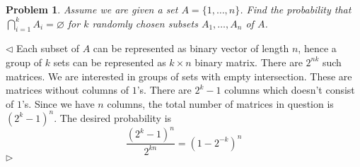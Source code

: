 \documentclass[12pt]{article}
\newtheorem{problem}{Problem}[subsection]
\newenvironment{solution}{\par $\triangleleft$}{$\triangleright$}
\begin{document}
\begin{problem} Assume we are given a set $A=\{1,\ldots,n\}$. Find the
probability that $\bigcap_{i=1}^k A_i=\varnothing$ for $k$ randomly chosen
subsets $A_1,\ldots,A_n$ of $A$.
\end{problem}
\begin{solution} Each subset of $A$ can be represented as binary vector of
    length $n$, hence a group of $k$ sets can be represented as $k\times n$
    binary matrix. There are $2^{nk}$ such matrices. We are interested in groups
    of sets with empty intersection. These are matrices without columns of
    $1$'s. There are $2^k-1$ columns which doesn't consist of $1$'s. Since we
    have $n$ columns, the total number of matrices in question is ${(2^k-1)}^n$.
    The desired probability is
    $$
        \frac{{(2^k-1)}^n}{2^{kn}}={(1-2^{-k})}^n
    $$
\end{solution}
\end{document}
